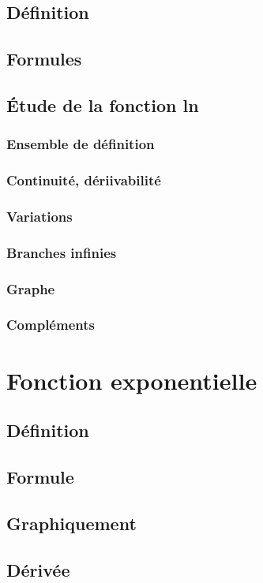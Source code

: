 \documentclass[12pt,a4paper,french]{book}
\begin{document}
		\subsection{Définition}
		\subsection{Formules}
		\subsection{Étude de la fonction ln}
			\subsubsection{Ensemble de définition}
			\subsubsection{Continuité, dériivabilité}
			\subsubsection{Variations}
			\subsubsection{Branches infinies}
			\subsubsection{Graphe}
			\subsubsection{Compléments}
	\section{Fonction exponentielle}
		\subsection{Définition}
		\subsection{Formule}
		\subsection{Graphiquement}
		\subsection{Dérivée}
\end{document}
